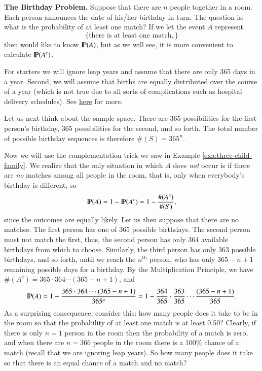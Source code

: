 \documentclass[captions=tableheading]{scrbook}
\begin{document}
\begin{example}
\textbf{The Birthday Problem.} Suppose that there are \(n\) people together in a room. Each person announces the date of his/her birthday in turn. The question is: what is the probability of at least one match? If we let the event \(A\) represent 
\[
\{ \mbox{there is at least one match}, \}
\]
then would like to know \(\P(A)\), but as we will see, it is more convenient to calculate \(\P(A^{c})\).

For starters we will ignore leap years and assume that there are only 365 days in a year. Second, we will assume that births are equally distributed over the course of a year (which is not true due to all sorts of complications such as hospital delivery schedules). See \href{http://en.wikipedia.org/wiki/Birthday_problem}{here} for more.

Let us next think about the sample space. There are 365 possibilities for the first person's birthday, 365 possibilities for the second, and so forth. The total number of possible birthday sequences is therefore \(\#(S)=365^{n}\).

Now we will use the complementation trick we saw in Example \ref{exa:three-child-family}. We realize that the only situation in which \(A\) does \emph{not} occur is if there are \emph{no} matches among all people in the room, that is, only when everybody's birthday is different, so
\[
\P(A)=1-\P(A^{c})=1-\frac{\#(A^{c})}{\#(S)},
\]
since the outcomes are equally likely. Let us then suppose that there are no matches. The first person has one of 365 possible birthdays. The second person must not match the first, thus, the second person has only 364 available birthdays from which to choose. Similarly, the third person has only 363 possible birthdays, and so forth, until we reach the \(n^{\mathrm{th}}\) person, who has only \(365-n+1\) remaining possible days for a birthday. By the Multiplication Principle, we have \(\#(A^{c})=365\cdot364\cdots(365-n+1)\), and
\begin{equation}
\P(A)=1-\frac{365\cdot364\cdots(365-n+1)}{365^{n}}=1-\frac{364}{365}\cdot\frac{363}{365}\cdots\frac{(365-n+1)}{365}.
\end{equation}
As a surprising consequence, consider this: how many people does it take to be in the room so that the probability of at least one match is at least 0.50? Clearly, if there is only \(n=1\) person in the room then the probability of a match is zero, and when there are \(n=366\) people in the room there is a 100\% chance of a match (recall that we are ignoring leap years). So how many people does it take so that there is an equal chance of a match and no match?


\end{example}
\end{document}
